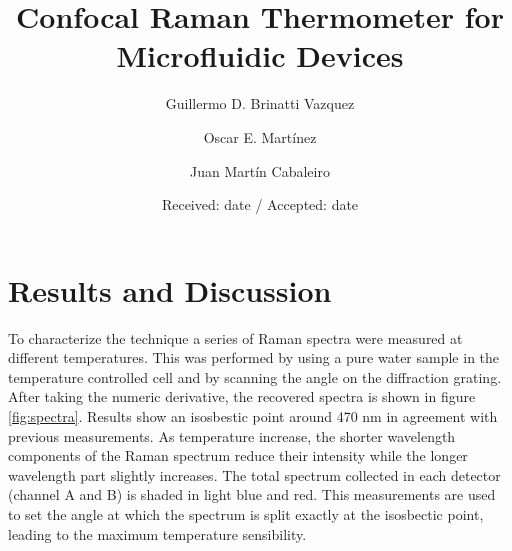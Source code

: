 \documentclass[twocolumn]{svjour3}       %
\begin{document}
\title{Confocal Raman Thermometer for Microfluidic Devices}



\author{Guillermo D. Brinatti Vazquez         \and
        Oscar E. Mart\'{i}nez \and
        Juan Mart\'{i}n Cabaleiro %
}



\date{Received: date / Accepted: date}


\maketitle

\begin{abstract}
\end{abstract}

\section{Results and Discussion}

To characterize the technique a series of Raman spectra were measured at different temperatures. This was performed by using a pure water sample in the temperature controlled cell and by scanning the angle on the diffraction grating. After taking the numeric derivative, the recovered spectra is shown in figure \ref{fig:spectra}. Results show an isosbestic point around 470 nm in agreement with previous measurements\cite{walrafen1}. As temperature increase, the shorter wavelength components of the Raman spectrum reduce their intensity while the longer wavelength part slightly increases. The total spectrum collected in each detector (channel A and B) is shaded in light blue and red. This measurements are used to set the angle at which the spectrum is split exactly at the isosbectic point, leading to the maximum temperature sensibility. 
\end{document}
